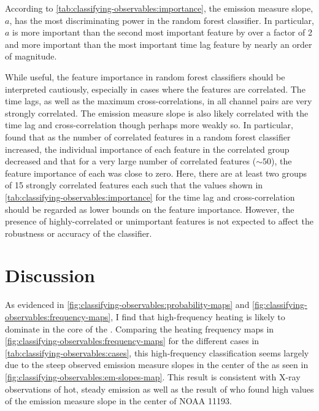 According to \autoref{tab:classifying-observables:importance}, the emission measure slope, $a$, has the most discriminating power in the random forest classifier. In particular, $a$ is more important than the second most important feature by over a factor of 2 and more important than the most important time lag feature by nearly an order of magnitude.

While useful, the feature importance in random forest classifiers should be interpreted cautiously, especially in cases where the features are correlated. The time lags, as well as the maximum cross-correlations, in all channel pairs are very strongly correlated. The emission measure slope is also likely correlated with the time lag and cross-correlation though perhaps more weakly so. In particular, \citet{altmann_permutation_2010} found that as the number of correlated features in a random forest classifier increased, the individual importance of each feature in the correlated group decreased and that for a very large number of correlated features ($\sim50$), the feature importance of each was close to zero. Here, there are at least two groups of 15 strongly correlated features each such that the values shown in \autoref{tab:classifying-observables:importance} for the time lag and cross-correlation should be regarded as lower bounds on the feature importance. However, the presence of highly-correlated or unimportant features is not expected to affect the robustness or accuracy of the classifier.

\section{Discussion}\label{sec:classifying-observables:discussion}

As evidenced in \autoref{fig:classifying-observables:probability-maps} and \autoref{fig:classifying-observables:frequency-maps}, I find that high-frequency heating is likely to dominate in the core of the \AR. Comparing the heating frequency maps in \autoref{fig:classifying-observables:frequency-maps} for the different cases in \autoref{tab:classifying-observables:cases}, this high-frequency classification seems largely due to the steep observed emission measure slopes in the center of the \AR{} as seen in \autoref{fig:classifying-observables:em-slopes-map}. This result is consistent with X-ray observations of hot, steady emission \citep{warren_evidence_2010,warren_constraints_2011,winebarger_using_2011} as well as the result of \citet{del_zanna_evolution_2015} who found high values of the emission measure slope in the center of NOAA 11193.

